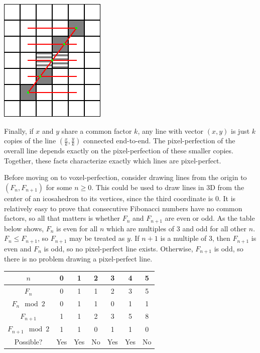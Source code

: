 \documentclass{article}
\begin{document}
\begin{center}
\includegraphics[width=0.25\linewidth]{grid2.png}
\end{center}

Finally, if $x$ and $y$ share a common factor $k$,
any line with vector $(x, y)$
is just $k$ copies of the line $\left(\frac{x}{k}, \frac{y}{k}\right)$
connected end-to-end.
The pixel-perfection of the overall line
depends exactly on the pixel-perfection of these smaller copies.
Together, these facts characterize exactly which lines are pixel-perfect.

Before moving on to voxel-perfection,
consider drawing lines from the origin to $(F_n, F_{n+1})$
for some $n \geq 0$.
This could be used to draw lines in 3D from the center of an icosahedron to its vertices,
since the third coordinate is 0.
It is relatively easy to prove that consecutive Fibonacci numbers have no common factors,
so all that matters is whether $F_n$ and $F_{n+1}$ are even or odd.
As the table below shows,
$F_n$ is even for all $n$ which are multiples of 3
and odd for all other $n$.
$F_n \leq F_{n+1}$,
so $F_{n+1}$ may be treated as $y$.
If $n+1$ is a multiple of 3, then $F_{n+1}$ is even and $F_n$ is odd,
so no pixel-perfect line exists.
Otherwise, $F_{n+1}$ is odd, so there is no problem drawing a pixel-perfect line.

\begin{center}
\begin{tabular}{|c|c|c|c|c|c|c|}
  \hline
  $n$ & 0 & 1 & 2 & 3 & 4 & 5 \\ \hline
  $F_n$ & 0 & 1 & 1 & 2 & 3 & 5 \\ \hline
  $F_n \mod 2$ & 0 & 1 & 1 & 0 & 1 & 1 \\ \hline
  $F_{n+1}$ & 1 & 1 & 2 & 3 & 5 & 8 \\ \hline
  $F_{n+1} \mod 2$ & 1 & 1 & 0 & 1 & 1 & 0 \\ \hline
  Possible? & Yes & Yes & No & Yes & Yes & No \\ \hline
\end{tabular}
\end{center}
\end{document}
